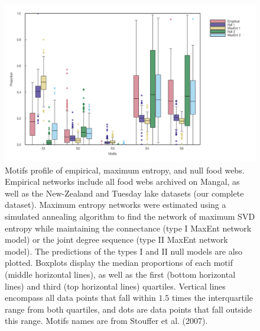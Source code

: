 \documentclass[11pt]{article}
\makeatletter
\def\maxwidth{\ifdim\Gin@nat@width>\linewidth\linewidth
\else\Gin@nat@width\fi}
\let\Oldincludegraphics\includegraphics
\renewcommand{\includegraphics}[1]{\Oldincludegraphics[width=\maxwidth]{#1}}
\makeatother
\begin{document}
\begin{figure}
\hypertarget{fig:motifs}{%
\centering
\includegraphics{figures/motifs_distribution.png}
\caption{Motifs profile of empirical, maximum entropy, and null food
webs. Empirical networks include all food webs archived on Mangal, as
well as the New-Zealand and Tuesday lake datasets (our complete
dataset). Maximum entropy networks were estimated using a simulated
annealing algorithm to find the network of maximum SVD entropy while
maintaining the connectance (type I MaxEnt network model) or the joint
degree sequence (type II MaxEnt network model). The predictions of the
types I and II null models are also plotted. Boxplots display the median
proportions of each motif (middle horizontal lines), as well as the
first (bottom horizontal lines) and third (top horizontal lines)
quartiles. Vertical lines encompass all data points that fall within
\(1.5\) times the interquartile range from both quartiles, and dots are
data points that fall outside this range. Motifs names are from Stouffer
et al. (2007).}\label{fig:motifs}
}
\end{figure}
\end{document}

